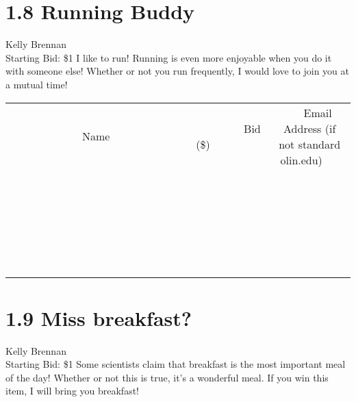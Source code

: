 \documentclass[11pt]{article}
\begin{document}
\section*{1.8 Running Buddy}
Kelly Brennan
\\
Starting Bid: \$1
\newline
I like to run! Running is even more enjoyable when you do it with someone else! Whether or not you run frequently, I would love to join you at a mutual time!
\\[6ex]
\begin{tabular}{c c c}
~~~~~~~~~~~~~Name~~~~~~~~~~~~~ & ~~~~~~~~~Bid (\$)~~~~~~~~~  & ~~~Email Address (if not standard olin.edu)~~~\\
 & & \\
\hline
 & & \\
\hline
 & & \\
\hline
 & & \\
\hline
 & & \\
\hline
 & & \\
\hline
 & & \\
\hline
 & & \\
\hline
 & & \\
\hline
 & & \\
\hline
 & & \\
\hline
 & & \\
\hline
 & & \\
\hline
 & & \\
\hline
 & & \\
\hline
 & & \\
\hline
 & & \\
\hline
 & & \\
\hline
 & & \\
\hline
 & & \\
\hline
 & & \\
\hline
 & & \\
\hline
 & & \\
\hline
 & & \\
\hline
 & & \\
\hline
 & & \\
\hline
\end{tabular}
\newpage
\section*{1.9 Miss breakfast?}
Kelly Brennan
\\
Starting Bid: \$1
\newline
Some scientists claim that breakfast is the most important meal of the day! Whether or not this is true, it's a wonderful meal. If you win this item, I will bring you breakfast!
\end{document}
